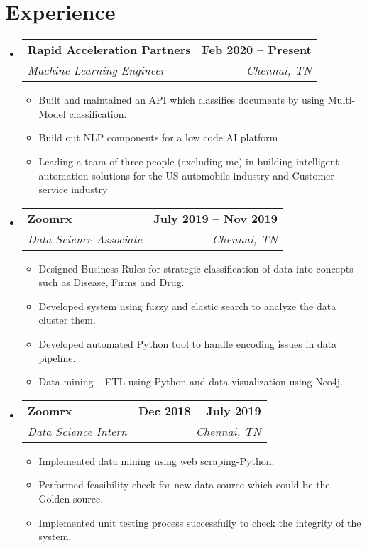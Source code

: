 \documentclass[letterpaper,11pt]{article}
\makeatletter
\newcommand{\resumeItem}[1]{
  \item\small{
    {#1 \vspace{-2pt}}
  }
}
\newcommand{\resumeSubheading}[4]{
  \vspace{-2pt}\item
    \begin{tabular*}{1.0\textwidth}[t]{l@{\extracolsep{\fill}}r}
      \textbf{#1} & \textbf{\small #2} \\
      \textit{\small#3} & \textit{\small #4} \\
    \end{tabular*}\vspace{-7pt}
}
\newcommand{\resumeSubHeadingListStart}{\begin{itemize}[leftmargin=0.0in, label={}]}
\newcommand{\resumeSubHeadingListEnd}{\end{itemize}}
\newcommand{\resumeItemListStart}{\begin{itemize}}
\newcommand{\resumeItemListEnd}{\end{itemize}\vspace{-5pt}}
\makeatother
\begin{document}
\section{Experience}
  \resumeSubHeadingListStart
      
    \resumeSubheading
      {Rapid Acceleration Partners}{Feb 2020 -- Present}
      {Machine Learning Engineer}{Chennai, TN}
      \resumeItemListStart
        \resumeItem{Built and maintained an API which classifies documents by using Multi-Model classification.}
        \resumeItem{Build out NLP components for a low code AI platform}
        \resumeItem{Leading a team of three people (excluding me) in building intelligent automation solutions for the
US automobile industry and Customer service industry}
    \resumeItemListEnd

    \resumeSubheading
      {Zoomrx}{July 2019 -- Nov 2019}
      {Data Science Associate}{Chennai, TN}
      \resumeItemListStart
        \resumeItem{Designed Business Rules for strategic classification of data into concepts such as Disease, Firms and Drug.}
        \resumeItem{Developed system using fuzzy and elastic search to analyze the data cluster them.}
        \resumeItem{Developed automated Python tool to handle encoding issues in data pipeline.}
        \resumeItem{Data mining – ETL using Python and data visualization using Neo4j.}
      \resumeItemListEnd

    \resumeSubheading
      {Zoomrx}{Dec 2018 -- July 2019}
      {Data Science Intern}{Chennai, TN}
      \resumeItemListStart
        \resumeItem{Implemented data mining using web scraping-Python.}
        \resumeItem{Performed feasibility check for new data source which could be the Golden source.}
        \resumeItem{Implemented unit testing process successfully to check the integrity of the system.}
      \resumeItemListEnd
    
  \resumeSubHeadingListEnd
\vspace{-16pt}

\end{document}
